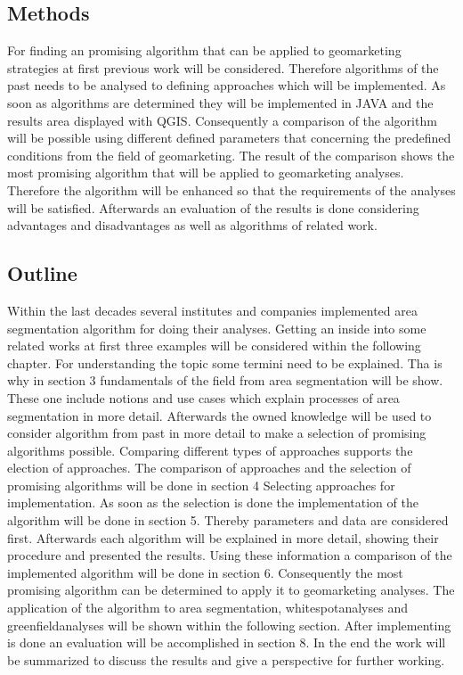 \subsection{Methods}
For finding an promising algorithm that can be applied to geomarketing strategies at first previous work will be considered. Therefore algorithms of the past needs to be analysed to defining approaches which will be implemented. As soon as algorithms are determined they will be implemented in JAVA and the results area displayed with QGIS. Consequently a comparison of the algorithm will be possible using different defined parameters that concerning the predefined conditions from the field of geomarketing. The result of the comparison shows the most promising algorithm that will be applied to geomarketing analyses. Therefore the algorithm will be enhanced so that the requirements of the analyses will be satisfied. Afterwards an evaluation of the results is done considering advantages and disadvantages as well as algorithms of related work. 

\subsection{Outline}
Within the last decades several institutes and companies implemented area segmentation algorithm for doing their analyses. Getting an inside into some related works at first three examples will be considered within the following chapter. For understanding the topic some termini need to be explained. Tha is why in section 3 fundamentals of the field from area segmentation will be show. These one include notions and use cases which explain processes of area segmentation in more detail. Afterwards the owned knowledge will be used to consider algorithm from past in more detail to make a selection of promising algorithms possible. Comparing different types of approaches supports the election of approaches. The comparison of approaches and the selection of promising algorithms will be done in section 4 Selecting approaches for implementation. As soon as the selection is done the implementation of the algorithm will be done in section 5. Thereby parameters and data are considered first. Afterwards each algorithm will be explained in more detail, showing their procedure and presented the results. Using these information a comparison of the implemented algorithm will be done in section 6. Consequently the most promising algorithm can be determined to apply it to geomarketing analyses. The application of the algorithm to area segmentation, whitespotanalyses and greenfieldanalyses will be shown within the following section. After implementing is done an evaluation will be accomplished in section 8. In the end the work will be summarized to discuss the results and give a perspective for further working.